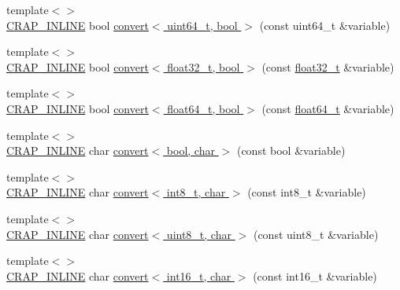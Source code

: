 \begin{DoxyCompactItemize}
\item 
{\footnotesize template$<$$>$ }\\\hyperlink{config__x86_8h_a5a40526b8d842e7ff731509998bb0f1c}{C\+R\+A\+P\+\_\+\+I\+N\+L\+I\+N\+E} bool \hyperlink{namespacecrap_a0c45e5535adffc501e93cf2d97878367}{convert$<$ uint64\+\_\+t, bool $>$} (const uint64\+\_\+t \&variable)
\item 
{\footnotesize template$<$$>$ }\\\hyperlink{config__x86_8h_a5a40526b8d842e7ff731509998bb0f1c}{C\+R\+A\+P\+\_\+\+I\+N\+L\+I\+N\+E} bool \hyperlink{namespacecrap_a0993f6638b4cf291cf6d24f6f0ec5df1}{convert$<$ float32\+\_\+t, bool $>$} (const \hyperlink{crap__types_8h_a4611b605e45ab401f02cab15c5e38715}{float32\+\_\+t} \&variable)
\item 
{\footnotesize template$<$$>$ }\\\hyperlink{config__x86_8h_a5a40526b8d842e7ff731509998bb0f1c}{C\+R\+A\+P\+\_\+\+I\+N\+L\+I\+N\+E} bool \hyperlink{namespacecrap_af500e2a45006f67b11d73cadd17ac47c}{convert$<$ float64\+\_\+t, bool $>$} (const \hyperlink{crap__types_8h_ac55f3ae81b5bc9053760baacf57e47f4}{float64\+\_\+t} \&variable)
\item 
{\footnotesize template$<$$>$ }\\\hyperlink{config__x86_8h_a5a40526b8d842e7ff731509998bb0f1c}{C\+R\+A\+P\+\_\+\+I\+N\+L\+I\+N\+E} char \hyperlink{namespacecrap_a8e497e8fa12071366772dd50d3db8fce}{convert$<$ bool, char $>$} (const bool \&variable)
\item 
{\footnotesize template$<$$>$ }\\\hyperlink{config__x86_8h_a5a40526b8d842e7ff731509998bb0f1c}{C\+R\+A\+P\+\_\+\+I\+N\+L\+I\+N\+E} char \hyperlink{namespacecrap_a4c78ba750ca31565138e56c7384f0b16}{convert$<$ int8\+\_\+t, char $>$} (const int8\+\_\+t \&variable)
\item 
{\footnotesize template$<$$>$ }\\\hyperlink{config__x86_8h_a5a40526b8d842e7ff731509998bb0f1c}{C\+R\+A\+P\+\_\+\+I\+N\+L\+I\+N\+E} char \hyperlink{namespacecrap_aa0bb67ceceaa770f21922bfd27395733}{convert$<$ uint8\+\_\+t, char $>$} (const uint8\+\_\+t \&variable)
\item 
{\footnotesize template$<$$>$ }\\\hyperlink{config__x86_8h_a5a40526b8d842e7ff731509998bb0f1c}{C\+R\+A\+P\+\_\+\+I\+N\+L\+I\+N\+E} char \hyperlink{namespacecrap_ab748e70e2ed8603b3316c09d6d68661a}{convert$<$ int16\+\_\+t, char $>$} (const int16\+\_\+t \&variable)
\item 

\end{DoxyCompactItemize}
